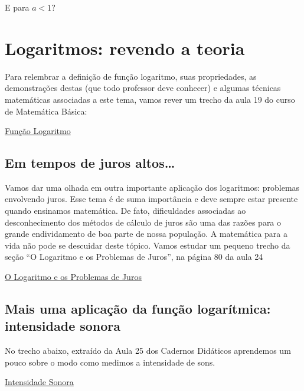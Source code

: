 \documentclass[12pt, a4paper]{article}
\begin{document}
E para $a < 1$?

\section{Logaritmos: revendo a teoria}

Para relembrar a definição de função logaritmo, suas propriedades, as demonstrações destas (que todo professor deve conhecer) e algumas técnicas matemáticas associadas a este tema, vamos rever um trecho da aula 19 do curso de Matemática Básica:

\begin{observacao}
\href{https://graduacao.cederj.edu.br/pluginfile.php/25012/mod_resource/content/1/Trecho%20Fun%C3%A7%C3%A3o%20Logaritmo%20MB.pdf}{Função Logaritmo}
\end{observacao}

\subsection{Em tempos de juros altos\ldots}

Vamos dar uma olhada em outra importante aplicação dos logaritmos: problemas envolvendo juros. Esse tema é de suma importância e deve sempre estar presente quando ensinamos matemática. De fato, dificuldades associadas ao desconhecimento dos métodos de cálculo de juros são uma das razões para o grande endividamento de boa parte de nossa população. A matemática para a vida não pode se descuidar deste tópico. Vamos estudar um pequeno trecho da seção “O Logaritmo e os Problemas de Juros”, na página 80 da aula 24

\begin{observacao}
  \href{https://graduacao.cederj.edu.br/pluginfile.php/25014/mod_resource/content/1/trecho%20aula%2024%20ieaa%20-%20Juros.pdf}{O Logaritmo e os Problemas de Juros}
\end{observacao}

\subsection{Mais uma aplicação da função logarítmica:  intensidade sonora}

No trecho abaixo, extraído da Aula 25 dos Cadernos Didáticos aprendemos um pouco sobre o modo como medimos a intensidade de sons.

\begin{observacao}
  \href{https://graduacao.cederj.edu.br/pluginfile.php/25016/mod_resource/content/3/Intensidade%20sonora%20e%20logaritmo.pdf}{Intensidade Sonora}
\end{observacao}
\end{document}
